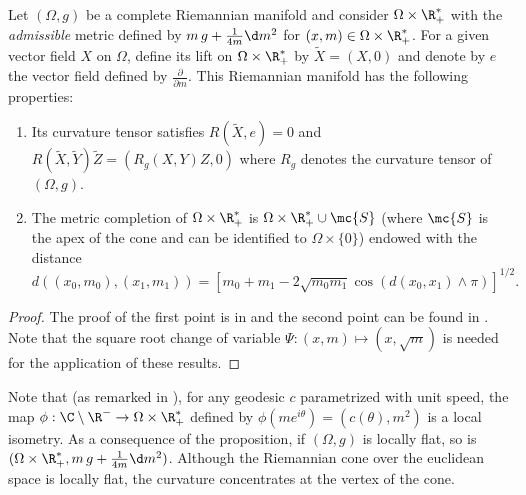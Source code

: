 \begin{proposition}\label{RiemannianMetric}
Let  $(\Omega,g)$ be a complete Riemannian manifold and consider $\Omega \times \R_+^*$ with the \textit{admissible} metric defined by $ m \, g + \frac{1}{4 m} \d m^2$ for $(x,m) \in \Omega \times \R_+^*$. For a given vector field $X$ on $\Omega$, define its lift on $\Omega \times \R_+^*$ by $\tilde{X}= (X,0)$ and denote by $e$ the vector field defined by $\frac{\partial}{\partial m}$.
This Riemannian manifold has the following properties:
\begin{enumerate}
\item Its curvature tensor satisfies $R(\tilde{X},e) = 0$ and $R(\tilde{X},\tilde{Y})\tilde{Z} = (R_g(X,Y)Z,0)$ where $R_g$ denotes the curvature tensor of $(\Omega,g)$.
\item The metric completion of $\Omega \times \R_+^*$ is $\Omega \times \R_+^* \cup \mc{S}$ (where $\mc{S}$ is the apex of the cone and can be identified to $ \Omega \times \{ 0\}$) endowed with the distance
\begin{equation}
d\left((x_0,m_0),(x_1,m_1)\right) = \left[ m_0 + m_1 -2\sqrt{m_0 m_1} \cos \left(d(x_0,x_1) \wedge \pi \right) \right]^{1/2}.
\end{equation}
\end{enumerate}
\end{proposition}

\begin{proof}
The proof of the first point is in \cite{Gallot1979} and the second point can be found in \cite{MetricGeometryBurago}. Note that the square root change of variable $\Psi: (x,m) \mapsto (x,\sqrt{m})$ is needed for the application of these results.
\end{proof}


Note that (as remarked in \cite{Gallot1979}), for any geodesic $c$ parametrized with unit speed, the map $\phi: \C \setminus \R^- \to \Omega \times \R_+^*$ defined by $\phi(m e^{i\theta}) = (c(\theta),m^2)$ is a local isometry. 
As a consequence of the proposition, if $(\Omega,g)$ is locally flat, so is $(\Omega \times \R_+^*, m \, g + \frac{1}{4 m} \d m^2)$.
Although the Riemannian cone over the euclidean space is locally flat, the curvature concentrates at the vertex of the cone. %


